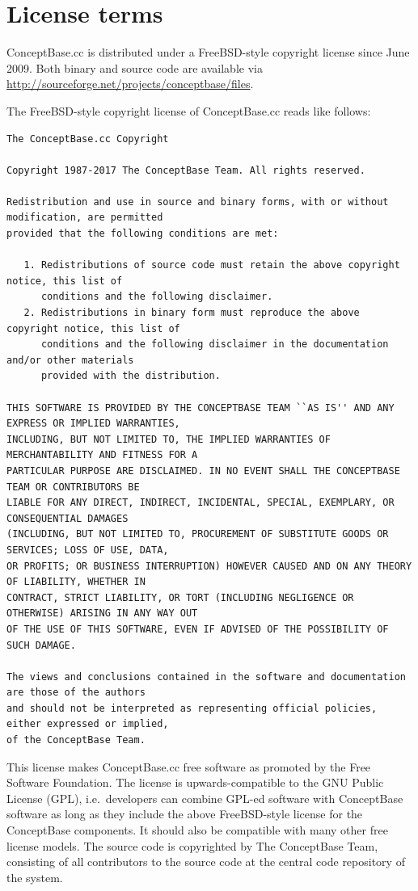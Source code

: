 \newpage
\section{License terms}
\label{sec:license}

ConceptBase.cc is distributed under a FreeBSD-style copyright license since June 2009.
Both binary and source code are available via \url{http://sourceforge.net/projects/conceptbase/files}. 

The FreeBSD-style copyright license of ConceptBase.cc reads like follows:

{\scriptsize
\begin{verbatim}
The ConceptBase.cc Copyright

Copyright 1987-2017 The ConceptBase Team. All rights reserved.

Redistribution and use in source and binary forms, with or without modification, are permitted
provided that the following conditions are met:

   1. Redistributions of source code must retain the above copyright notice, this list of
      conditions and the following disclaimer.
   2. Redistributions in binary form must reproduce the above copyright notice, this list of
      conditions and the following disclaimer in the documentation and/or other materials
      provided with the distribution.

THIS SOFTWARE IS PROVIDED BY THE CONCEPTBASE TEAM ``AS IS'' AND ANY EXPRESS OR IMPLIED WARRANTIES,
INCLUDING, BUT NOT LIMITED TO, THE IMPLIED WARRANTIES OF MERCHANTABILITY AND FITNESS FOR A
PARTICULAR PURPOSE ARE DISCLAIMED. IN NO EVENT SHALL THE CONCEPTBASE TEAM OR CONTRIBUTORS BE
LIABLE FOR ANY DIRECT, INDIRECT, INCIDENTAL, SPECIAL, EXEMPLARY, OR CONSEQUENTIAL DAMAGES
(INCLUDING, BUT NOT LIMITED TO, PROCUREMENT OF SUBSTITUTE GOODS OR SERVICES; LOSS OF USE, DATA,
OR PROFITS; OR BUSINESS INTERRUPTION) HOWEVER CAUSED AND ON ANY THEORY OF LIABILITY, WHETHER IN
CONTRACT, STRICT LIABILITY, OR TORT (INCLUDING NEGLIGENCE OR OTHERWISE) ARISING IN ANY WAY OUT
OF THE USE OF THIS SOFTWARE, EVEN IF ADVISED OF THE POSSIBILITY OF SUCH DAMAGE.

The views and conclusions contained in the software and documentation are those of the authors
and should not be interpreted as representing official policies, either expressed or implied,
of the ConceptBase Team.
\end{verbatim}
}

This license makes ConceptBase.cc free software as promoted by the Free Software Foundation. 
The license is upwards-compatible to the GNU Public License (GPL), i.e.\ developers
can combine GPL-ed software with ConceptBase software as long as they
include the above FreeBSD-style license for the ConceptBase components.
It should also be compatible with many other free license
models. The source code is copyrighted by The ConceptBase Team, consisting of
all contributors to the source code at the central code repository of the system.


